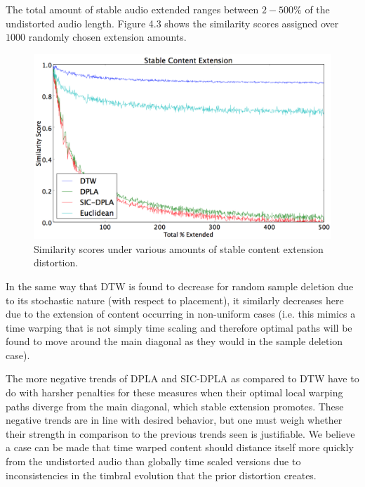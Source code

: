 \documentclass[a4paper,12pt]{report} 	%
\numberwithin{figure}{chapter}
\numberwithin{table}{chapter}
\numberwithin{equation}{chapter}
\begin{document}
\begin{flushleft}
The total amount of stable audio extended ranges between $2-500\%$ of the undistorted audio length. Figure 4.3 shows the similarity scores assigned over $1000$ randomly chosen extension amounts.

\begin{figure}[h!]
\begin{center}
\includegraphics[scale=0.5,width=\linewidth]{StableExtension}
\caption[Extension of Stable Timbral Content Results]{Similarity scores under various amounts of stable content extension distortion.}
\end{center}
\end{figure}
In the same way that DTW is found to decrease for random sample deletion due to its stochastic nature (with respect to placement), it similarly decreases here due to the extension of content occurring in non-uniform cases (i.e. this mimics a time warping that is not simply time scaling and therefore optimal paths will be found to move around the main diagonal as they would in the sample deletion case). 

The more negative trends of DPLA and SIC-DPLA as compared to DTW have to do with harsher penalties for these measures when their optimal local warping paths diverge from the main diagonal, which stable extension promotes. These negative trends are in line with desired behavior, but one must weigh whether their strength in comparison to the previous trends seen is justifiable. We believe a case can be made that time warped content should distance itself more quickly from the undistorted audio than globally time scaled versions due to inconsistencies in the timbral evolution that the prior distortion creates. 


\end{flushleft}
\end{document}
